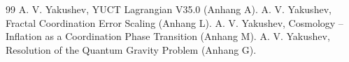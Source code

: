 \documentclass[12pt,a4paper]{article}
\begin{document}
	\begin{thebibliography}{99}
		 A. V. Yakushev, YUCT Lagrangian V35.0 (Anhang A).
		 A. V. Yakushev, Fractal Coordination Error Scaling (Anhang L).
		 A. V. Yakushev, Cosmology -- Inflation as a Coordination Phase Transition (Anhang M).
		 A. V. Yakushev, Resolution of the Quantum Gravity Problem (Anhang G).
	\end{thebibliography}
	
\end{document}
